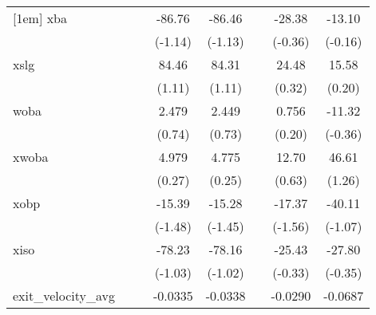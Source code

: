 {\begin{tabular}{l*{7}{c}}
[1em]
xba         &                     &                     &      -86.76         &      -86.46         &                     &      -28.38         &      -13.10         \\
            &                     &                     &     (-1.14)         &     (-1.13)         &                     &     (-0.36)         &     (-0.16)         \\
[1em]
xslg        &                     &                     &       84.46         &       84.31         &                     &       24.48         &       15.58         \\
            &                     &                     &      (1.11)         &      (1.11)         &                     &      (0.32)         &      (0.20)         \\
[1em]
woba        &                     &                     &       2.479         &       2.449         &                     &       0.756         &      -11.32         \\
            &                     &                     &      (0.74)         &      (0.73)         &                     &      (0.20)         &     (-0.36)         \\
[1em]
xwoba       &                     &                     &       4.979         &       4.775         &                     &       12.70         &       46.61         \\
            &                     &                     &      (0.27)         &      (0.25)         &                     &      (0.63)         &      (1.26)         \\
[1em]
xobp        &                     &                     &      -15.39         &      -15.28         &                     &      -17.37         &      -40.11         \\
            &                     &                     &     (-1.48)         &     (-1.45)         &                     &     (-1.56)         &     (-1.07)         \\
[1em]
xiso        &                     &                     &      -78.23         &      -78.16         &                     &      -25.43         &      -27.80         \\
            &                     &                     &     (-1.03)         &     (-1.02)         &                     &     (-0.33)         &     (-0.35)         \\
[1em]
exit\_velocity\_avg&                     &                     &     -0.0335         &     -0.0338         &                     &     -0.0290         &     -0.0687         \\

\end{tabular}}
